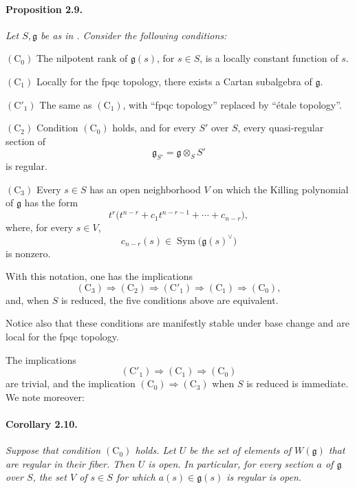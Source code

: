 
\paragraph{\textbf{Proposition 2.9.}}
{\itshape Let \(S,\mathfrak g\) be as in . Consider the following
conditions:

\smallskip
\noindent
\textup{\((\mathrm C_0)\)}
The nilpotent rank of \(\mathfrak g(s)\), for \(s\in S\), is a
locally constant function of \(s\).

\smallskip
\noindent
\textup{\((\mathrm C_1)\)}
Locally for the fpqc topology, there exists a Cartan subalgebra of
\(\mathfrak g\).

\smallskip
\noindent
\textup{\((\mathrm C'_1)\)}
The same as \((\mathrm C_1)\), with ``fpqc topology'' replaced by
``étale topology''.

\smallskip
\noindent
\textup{\((\mathrm C_2)\)}
Condition \((\mathrm C_0)\) holds, and for every \(S'\) over \(S\),
every quasi-regular section of
\[
  \mathfrak g_{S'}=\mathfrak g\otimes_S S'
\]
is regular.

\smallskip
\noindent
\textup{\((\mathrm C_3)\)}
Every \(s\in S\) has an open neighborhood \(V\) on which the
Killing polynomial of \(\mathfrak g\) has the form
\[
  t^r\bigl(t^{n-r}+c_1t^{n-r-1}+\cdots+c_{n-r}\bigr),
\]
where, for every \(s\in V\),
\[
  c_{n-r}(s)\in
  \operatorname{Sym}\!\bigl(\mathfrak g(s)^\vee\bigr)
\]
is nonzero.

\smallskip
With this notation, one has the implications
\[
  (\mathrm C_3)\Longrightarrow(\mathrm C_2)
  \Longrightarrow(\mathrm C'_1)\Longrightarrow(\mathrm C_1)
  \Longrightarrow(\mathrm C_0),
\]
and, when \(S\) is reduced, the five conditions above are
equivalent.}

Notice also that these conditions are manifestly stable under base
change and are local for the fpqc topology.

The implications
\[
  (\mathrm C'_1)\Longrightarrow(\mathrm C_1)
  \Longrightarrow(\mathrm C_0)
\]
are trivial, and the implication
\((\mathrm C_0)\Longrightarrow(\mathrm C_3)\) when \(S\) is
reduced is immediate. We note moreover:

\paragraph{\textbf{Corollary 2.10.}}
\emph{Suppose that condition \((\mathrm C_0)\) holds. Let \(U\) be
the set of elements of \(W(\mathfrak g)\) that are regular in their
fiber. Then \(U\) is open. In particular, for every section \(a\)
of \(\mathfrak g\) over \(S\), the set \(V\) of \(s\in S\) for
which \(a(s)\in\mathfrak g(s)\) is regular is open.}

